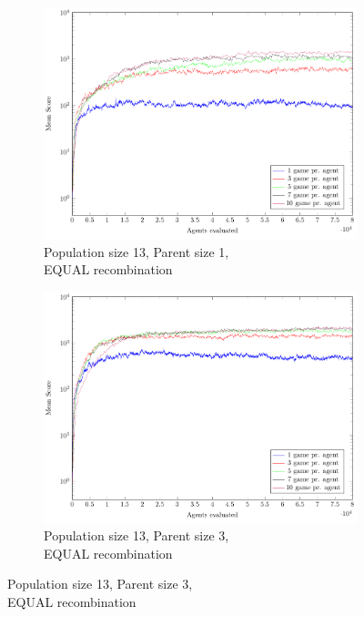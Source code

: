 \begin{figure}
	\centering
	\captionsetup[subfigure]{justification=centering}
    \begin{subfigure}[b]{0.49\textwidth}
    	\caption{Population size 13, Parent size 1,\\EQUAL recombination}
        \includegraphics[width=\textwidth]{data/cma_population_offspring/13x_split/equal_l13_o1/mean/PlotFile.pdf}
    \end{subfigure} 
    \begin{subfigure}[b]{0.49\textwidth}
    	\caption{Population size 13, Parent size 3,\\EQUAL recombination}
        \includegraphics[width=\textwidth]{data/cma_population_offspring/13x_split/equal_l13_o3/mean/PlotFile.pdf}

\end{subfigure}
\end{figure}
